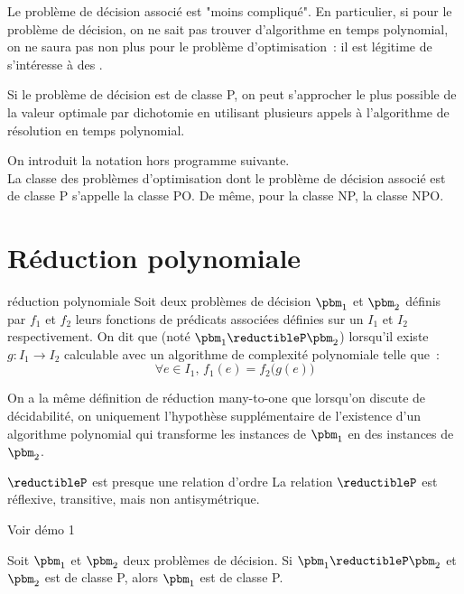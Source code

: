 Le problème de décision associé est "moins compliqué". En particulier, si pour le problème de décision, on ne sait pas trouver d'algorithme en temps polynomial, on ne saura pas non plus pour le problème d'optimisation~: il est légitime de s'intéresse à des .

\begin{remarque}{}{}
    Si le problème de décision est de classe P, on peut s'approcher le plus possible de la valeur optimale par dichotomie en utilisant plusieurs appels à l'algorithme de résolution en temps polynomial.
\end{remarque}
On introduit la notation hors programme suivante.\\
La classe des problèmes d'optimisation dont le problème de décision associé est de classe P s'appelle la classe PO.
De même, pour la classe NP, la classe NPO.

\section{Réduction polynomiale}


\begin{definition}{}{réduction polynomiale}
    Soit deux problèmes de décision $\pbm_1$ et $\pbm_2$ définis par $f_1$ et $f_2$ leurs fonctions de prédicats associées définies sur un $I_1$ et $I_2$ respectivement. On dit que  (noté $\pbm_1 \reductibleP \pbm_2$) lorsqu'il existe $g:I_1 \to I_2$ calculable avec un algorithme de complexité polynomiale telle que~:
    $$\forall e \in I_1,\, f_1(e) = f_2\Big(g(e)\Big)$$
\end{definition}

\begin{remarque}{}{}
    On a la même définition de réduction many-to-one que lorsqu'on discute de décidabilité, on uniquement l'hypothèse supplémentaire de l'existence d'un algorithme polynomial qui transforme les instances de $\pbm_1$ en des instances de $\pbm_2$.
\end{remarque}

\begin{proposition}{}{$\reductibleP$ est presque une relation d'ordre}
    La relation $\reductibleP$ est réflexive, transitive, mais non antisymétrique.
\end{proposition}
Voir démo 1

\begin{proposition}{}{}
    Soit $\pbm_1$ et $\pbm_2$ deux problèmes de décision. Si $\pbm_1 \reductibleP \pbm_2$ et $\pbm_2$ est de classe P, alors $\pbm_1$ est de classe P.
\end{proposition}

